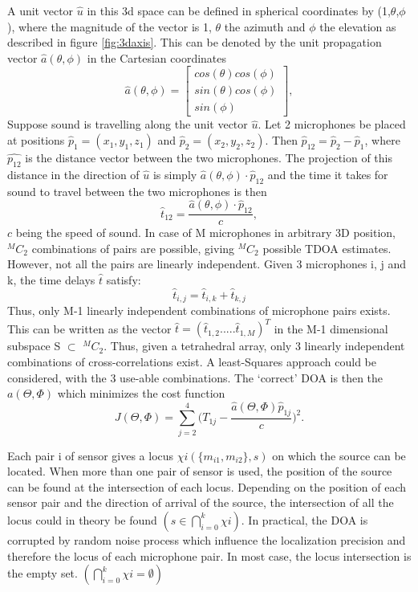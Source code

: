 A unit vector $\hat{u}$ in this 3d space can be defined in spherical coordinates by (1,$\theta$,$\phi$), where the magnitude of the vector is 1, $\theta$ the azimuth and $\phi$ the elevation as described in figure \ref{fig:3daxis}. This can be denoted by the unit propagation vector ${\hat{a}(\theta,\phi)}$ in the Cartesian coordinates
\begin{equation}
    \hat{a}(\theta,\phi)=\begin{bmatrix}cos(\theta)cos(\phi) \\sin(\theta)cos(\phi) \\sin(\phi)\end{bmatrix},
\end{equation}
Suppose sound is travelling along the unit vector $\hat{u}$. Let 2 microphones be placed at positions $\hat{p}_1=(x_1,y_1,z_1)$ and $\hat{p}_2=(x_2,y_2,z_2)$.  Then $\hat{p}_{12}=\hat{p}_{2}-\hat{p}_{1}$, where ${\hat{p_{12}}}$ is the distance vector between the two microphones. The projection of this distance in the direction of $\hat{u}$ is simply $\hat{a}(\theta,\phi)\cdot\hat{p}_{12}$ and the time it takes for sound to travel between the two microphones is then 
\begin{equation}
    \hat{t}_{12}=\frac{\hat{a}(\theta,\phi)\cdot\hat{p}_{12}}{c},
\end{equation} $c$ being the speed of sound. In case of M microphones in arbitrary 3D position, $^MC_2$ combinations of pairs are possible, giving $^MC_2$ possible TDOA estimates. However, not all the pairs are linearly independent. Given 3 microphones i, j and k, the time delays $\hat{t}$ satisfy:
\begin{equation}
    \hat{t}_{i,j}=\hat{t}_{i,k}+\hat{t}_{k,j}
    \label{Eq:linearDep}
\end{equation}
Thus, only M-1 linearly independent combinations of microphone pairs exists. This can be written as the vector $\hat{t}=(\hat{t}_{1,2}.....\hat{t}_{1,M})^T$ in the M-1 dimensional subspace S $\subset$ $^MC_2$. Thus, given a tetrahedral array, only 3 linearly independent combinations of cross-correlations exist. A least-Squares approach could be considered, with the 3 use-able combinations. The `correct' DOA is then the $a(\Theta,\Phi)$ which minimizes the cost function
\begin{equation}
    J(\Theta,\Phi) = \sum\limits_{j=2}^4\bigg(T_{1j}-\frac{\hat{a}(\Theta,\Phi)\hat{p}_{1j}}{c}\bigg)^2.
    \label{Eq:linearDepSol}
\end{equation}


\iffalse
Each pair i of sensor gives a locus $\chi{i}(\{m_{i1},m_{i2}\},s)$ on which the source can be located. When more than one pair of sensor is used, the position of the source can be found at the intersection of each locus. Depending on the position of each sensor pair and the direction of arrival of the source, the intersection of all the locus could in theory be found $ ( s\in {\bigcap}_{i=0}^k \chi{i} )$. In practical, the DOA is corrupted by random noise process which influence the localization precision and therefore the locus of each microphone pair. In most case, the locus intersection is the empty set. $ ( {\bigcap}_{i=0}^k \chi{i} = \emptyset ) $


